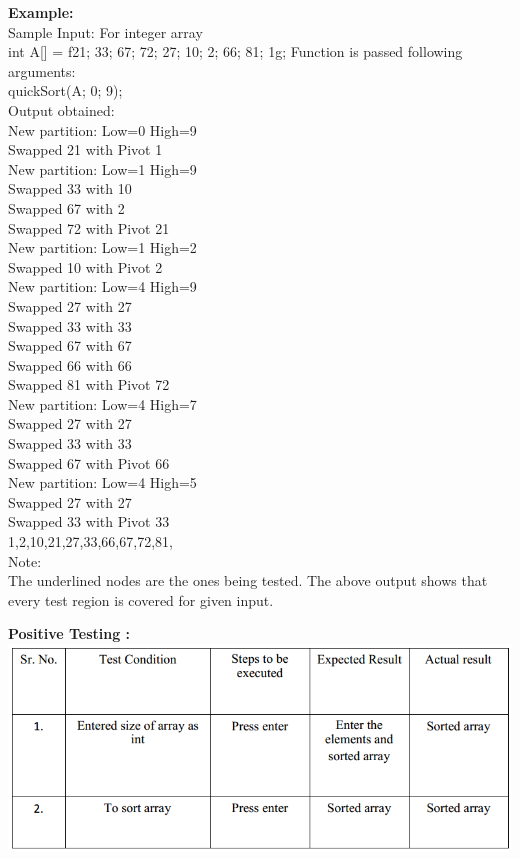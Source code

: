 \documentclass[a4paper,12pt]{article}
\begin{document}
{{\textbf{Example:}\\
Sample Input: For integer array\\
int A[] = f21; 33; 67; 72; 27; 10; 2; 66; 81; 1g; Function is passed following arguments:\\
quickSort(A; 0; 9);\\
Output obtained:\\
New partition: Low=0 High=9\\
Swapped 21 with Pivot 1\\
New partition: Low=1 High=9\\
Swapped 33 with 10\\
Swapped 67 with 2\\
Swapped 72 with Pivot 21\\
New partition: Low=1 High=2\\
Swapped 10 with Pivot 2\\
New partition: Low=4 High=9\\
Swapped 27 with 27\\
Swapped 33 with 33\\
Swapped 67 with 67\\
Swapped 66 with 66\\
Swapped 81 with Pivot 72\\
New partition: Low=4 High=7\\
Swapped 27 with 27\\
Swapped 33 with 33\\
Swapped 67 with Pivot 66\\
New partition: Low=4 High=5\\
Swapped 27 with 27\\
Swapped 33 with Pivot 33\\
1,2,10,21,27,33,66,67,72,81,\\
Note:\\
The underlined nodes are the ones being tested. The above output shows that every test region is
covered for given input.\\
\newpage

\textbf{Positive Testing :}\\
\includegraphics[width=\textwidth]{quicksort_positive}
\vspace{30px}

}}
\end{document}
